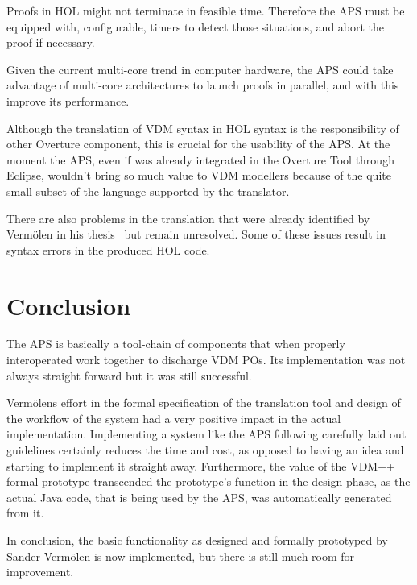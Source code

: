 \documentclass[]{article}
\begin{document}
Proofs in HOL might not terminate in feasible time.
Therefore the APS must be equipped with, configurable, timers to detect those situations, and abort the proof if necessary.

Given the current multi-core trend in computer hardware, the APS could take advantage of multi-core architectures to launch proofs in parallel, and with this improve its performance.

Although the translation of VDM syntax in HOL syntax is the responsibility of other Overture component, this is crucial for the usability of the APS.
At the moment the APS, even if was already integrated in the Overture Tool through Eclipse, wouldn't bring so much value to VDM modellers because of the quite small subset of the language supported by the translator.

There are also problems in the translation that were already identified by Verm\"olen in his thesis~\cite[OpenIssues]{SandersThesis} but remain unresolved.
Some of these issues result in syntax errors in the produced HOL code.

\section{Conclusion}
\label{sec:conclusion}

The APS is basically a tool-chain of components that when properly interoperated work together to discharge VDM POs.
Its implementation was not always straight forward but it was still successful.

Verm\"olens effort in the formal specification of the translation tool and design of the workflow of the system had a very positive impact in the actual implementation.
Implementing a system like the APS following carefully laid out guidelines certainly reduces the time and cost, as opposed to having an idea and starting to implement it straight away.
Furthermore, the value of the VDM++ formal prototype transcended the prototype's function in the design phase, as the actual Java code, that is being used by the APS, was automatically generated from it.

In conclusion, the basic functionality as designed and formally prototyped by Sander Verm\"olen is now implemented, but there is still much room for improvement.



\end{document}
